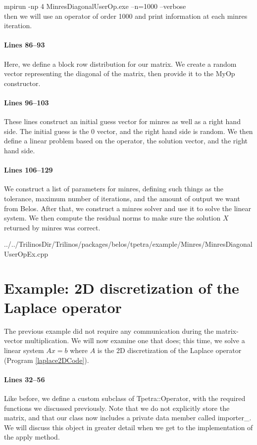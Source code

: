 \documentclass[pdf,12pt,report,strict]{SANDreport}
\begin{document}
{\ttfamily mpirun -np 4 MinresDiagonalUserOp.exe --n=1000 --verbose \\}
then we will use an operator of order 1000 and print information at each minres
iteration.

\paragraph{Lines 86--93}
Here, we define a block row distribution for our matrix.  We create a random
vector representing the diagonal of the matrix, then provide it to the MyOp
constructor.

\paragraph{Lines 96--103}
These lines construct an initial guess vector for minres as well as a right hand
side.  The initial guess is the $0$ vector, and the right hand side is random. 
We then define a linear problem based on the operator, the solution vector, and
the right hand side.

\paragraph{Lines 106--129}
We construct a list of parameters for minres, defining such things as the
tolerance, maximum number of iterations, and the amount of output we want from
Belos.  After that, we construct a minres solver and use it to solve the linear
system.  We then compute the residual norms to make sure the solution
$X$ returned by minres was correct.

\begin{lstinputlisting}[caption=MinresDiagonalUserOpEx.cpp,
label=diagCode]{../../TrilinosDir/Trilinos/packages/belos/tpetra/example/Minres/MinresDiagonalUserOpEx.cpp}
\end{lstinputlisting}

\section{Example: 2D discretization of the Laplace operator}
The previous example did not require any communication during the matrix-vector
multiplication.  We will now examine one that does; this time, we solve a linear
system $Ax=b$ where $A$ is the 2D discretization of the Laplace operator
(Program \ref{laplace2DCode}).

\paragraph{Lines 32--56}
Like before, we define a custom subclass of Tpetra::Operator, with the required
functions we discussed previously.  Note that we do not explicitly store the
matrix, and that our class now includes a private data member called importer\_. 
We will discuss this object in greater detail when we get to the implementation
of the apply method.
\end{document}

